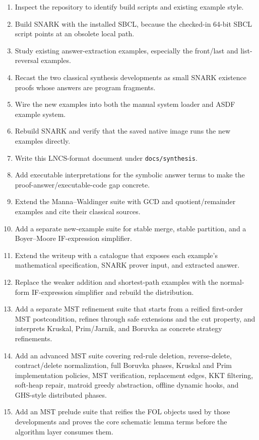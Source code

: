 \documentclass[runningheads]{llncs}
\begin{document}
\begin{enumerate}
\item Inspect the repository to identify build scripts and existing example
style.
\item Build SNARK with the installed SBCL, because the checked-in 64-bit SBCL
script points at an obsolete local path.
\item Study existing answer-extraction examples, especially the front/last and
list-reversal examples.
\item Recast the two classical synthesis developments as small SNARK
existence proofs whose answers are program fragments.
\item Wire the new examples into both the manual system loader and ASDF example
system.
\item Rebuild SNARK and verify that the saved native image runs the new
examples directly.
\item Write this LNCS-format document under \texttt{docs/synthesis}.
\item Add executable interpretations for the symbolic answer terms to make the
proof-answer/executable-code gap concrete.
\item Extend the Manna--Waldinger suite with GCD and quotient/remainder
examples and cite their classical sources.
\item Add a separate new-example suite for stable merge, stable partition, and
a Boyer--Moore IF-expression simplifier.
\item Extend the writeup with a catalogue that exposes each example's
mathematical specification, SNARK prover input, and extracted answer.
\item Replace the weaker addition and shortest-path examples with the
normal-form IF-expression simplifier and rebuild the distribution.
\item Add a separate MST refinement suite that starts from a reified
first-order MST postcondition, refines through safe extensions and the cut
property, and interprets Kruskal, Prim/Jarnik, and Boruvka as concrete
strategy refinements.
\item Add an advanced MST suite covering red-rule deletion, reverse-delete,
contract/delete normalization, full Boruvka phases, Kruskal and Prim
implementation policies, MST verification, replacement edges, KKT filtering,
soft-heap repair, matroid greedy abstraction, offline dynamic hooks, and
GHS-style distributed phases.
\item Add an MST prelude suite that reifies the FOL objects used by those
developments and proves the core schematic lemma terms before the algorithm
layer consumes them.
\end{enumerate}
\end{document}
